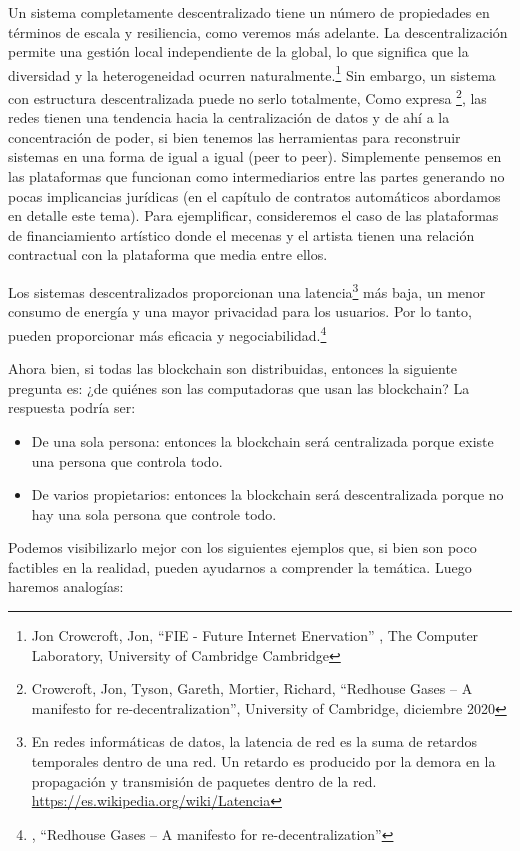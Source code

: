 \documentclass[12pt]{report} %
\begin{document}
\begin{itemize}
Un sistema completamente descentralizado tiene un número de propiedades en términos de escala y resiliencia, como veremos más adelante. La descentralización permite una gestión local independiente de la global, lo que significa que la diversidad y la heterogeneidad ocurren naturalmente.\footnote{Jon Crowcroft, Jon, “FIE - Future Internet Enervation” , The Computer Laboratory, University of Cambridge Cambridge}  Sin embargo, un sistema con estructura descentralizada puede no serlo totalmente, Como expresa  \footnote{Crowcroft, Jon, Tyson, Gareth, Mortier, Richard, “Redhouse Gases – A manifesto for re-decentralization”, University of Cambridge, diciembre 2020 }, las redes tienen una tendencia hacia la centralización de datos y de ahí a la concentración de poder, si bien tenemos las herramientas para reconstruir sistemas en una forma de igual a igual (peer to peer). Simplemente pensemos en las plataformas que funcionan como intermediarios entre las partes generando no pocas implicancias jurídicas (en el capítulo de contratos automáticos abordamos en detalle este tema). Para ejemplificar, consideremos el caso de las plataformas de financiamiento artístico donde el mecenas y el artista tienen una relación contractual con la plataforma que media entre ellos. 

Los sistemas descentralizados proporcionan una latencia\footnote{En redes informáticas de datos, la latencia de red es la suma de retardos temporales dentro de una red. Un retardo es producido por la demora en la propagación y transmisión de paquetes dentro de la red. \url{https://es.wikipedia.org/wiki/Latencia}}  más baja, un menor consumo de energía y una mayor privacidad para los usuarios. Por lo tanto, pueden proporcionar más eficacia y negociabilidad.\footnote{\cite{JonGareth2020}, “Redhouse Gases – A manifesto for re-decentralization”} 

Ahora bien, si todas las blockchain son distribuidas, entonces la siguiente pregunta es: ¿de quiénes son las computadoras que usan las blockchain? La respuesta podría ser:

\begin{itemize}
    \item De una sola persona: entonces la blockchain será centralizada porque existe una persona que controla todo.
    \item De varios propietarios: entonces la blockchain será descentralizada porque no hay una sola persona que controle todo.
\end{itemize}

Podemos visibilizarlo mejor con los siguientes ejemplos que, si bien son poco factibles en la realidad, pueden ayudarnos a comprender la temática. Luego haremos analogías:


\end{itemize}
\end{document}
